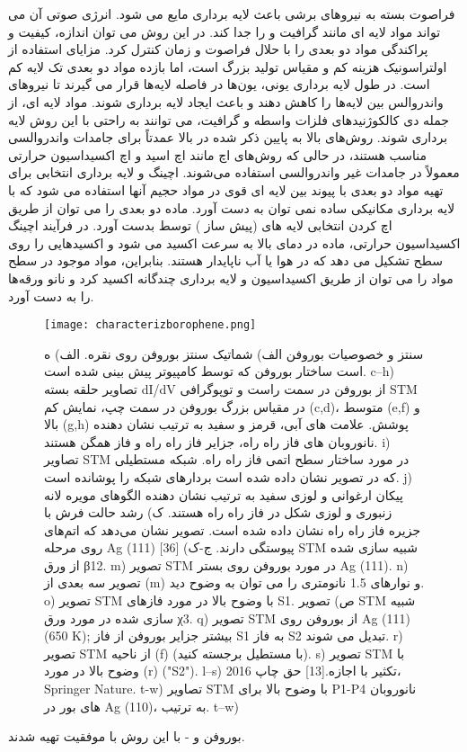 فراصوت بسته به نیروهای برشی باعث لایه برداری مایع می شود. انرژی صوتی آن می تواند مواد لایه ای مانند گرافیت و  را جدا کند. در این روش می توان اندازه، کیفیت و پراکندگی مواد دو بعدی را با حلال فراصوت و زمان کنترل کرد. مزایای استفاده از اولتراسونیک هزینه کم و مقیاس تولید بزرگ است، اما بازده مواد دو بعدی تک لایه کم است. در طول لایه برداری یونی، یون‌ها در فاصله لایه‌ها قرار می گیرند تا نیروهای واندروالس بین لایه‌ها را کاهش دهند و باعث ایجاد لایه برداری شوند. مواد لایه ای، از جمله دی کالکوژنیدهای فلزات واسطه  و گرافیت، می توانند به راحتی با این روش لایه برداری شوند. روش‌های بالا به پایین ذکر شده در بالا عمدتاً برای جامدات واندروالسی مناسب هستند، در حالی که روش‌های اچ مانند اچ اسید و اچ اکسیداسیون حرارتی معمولاً در جامدات غیر واندروالسی استفاده می‌شوند. اچینگ و لایه برداری انتخابی برای تهیه مواد دو بعدی با پیوند بین لایه ای قوی در مواد حجیم آنها استفاده می شود که با لایه برداری مکانیکی ساده نمی توان به دست آورد. ماده دو بعدی  را می توان از طریق اچ کردن انتخابی لایه های  (پیش ساز ) توسط  بدست آورد. در فرآیند اچینگ اکسیداسیون حرارتی، ماده در دمای بالا به سرعت اکسید می شود و اکسیدهایی را روی سطح تشکیل می دهد که در هوا یا آب ناپایدار هستند. بنابراین، مواد موجود در سطح مواد را می توان از طریق اکسیداسیون و لایه برداری چندگانه اکسید کرد و نانو ورقه‌ها را به دست آورد.
\begin{figure*}[!ht]
    \centering
    \texttt{[image: characterizborophene.png]}
    \caption{سنتز و خصوصیات بوروفن الف) شماتیک سنتز بوروفن روی نقره. الف) ه است ساختار بوروفن که توسط کامپیوتر پیش بینی شده است. c–h) تصاویر حلقه بسته dI/dV از بوروفن در سمت راست و توپوگرافی STM در مقیاس بزرگ بوروفن در سمت چپ، نمایش کم (c,d)، متوسط ​​(e,f) و بالا (g,h) پوشش. علامت های آبی، قرمز و سفید به ترتیب نشان دهنده نانوروبان های فاز راه راه، جزایر فاز راه راه و فاز همگن هستند. i) تصاویر STM در مورد ساختار سطح اتمی فاز راه راه. شبکه مستطیلی که در تصویر نشان داده شده است بردارهای شبکه را پوشانده است. j) پیکان ارغوانی و لوزی سفید به ترتیب نشان دهنده الگوهای مویره لانه زنبوری و لوزی شکل در فاز راه راه هستند. ک) رشد حالت فرش با جزیره فاز راه راه نشان داده شده است. تصویر نشان می‌دهد که اتم‌های روی مرحله Ag (111) پیوستگی دارند. ج-ک) [36] STM شبیه سازی شده از ورق β12. m) تصویر STM در مورد بوروفن روی بستر Ag (111). n) تصویر سه بعدی از (m) و نوارهای 1.5 نانومتری را می توان به وضوح دید. o) تصویر STM با وضوح بالا در مورد فازهای S1. ص) تصویر STM شبیه سازی شده در مورد ورق χ3. q) تصویر STM از بوروفن روی Ag (111) (650 K); بیشتر جزایر بوروفن از فاز S1 به فاز S2 تبدیل می شوند. r) تصویر STM از ناحیه (f) (با مستطیل برجسته کنید). s) تصویر STM با وضوح بالا در مورد (r) ("S2"). l–s) تکثیر با اجازه.[13] حق چاپ 2016، Springer Nature. t-w) تصاویر STM با وضوح بالا برای P1-P4 نانوروبان های بور در Ag (110)، به ترتیب. t–w)}
    \label{fig:charecterboro}
\end{figure*}
بوروفن و - با این روش با موفقیت تهیه شدند.
